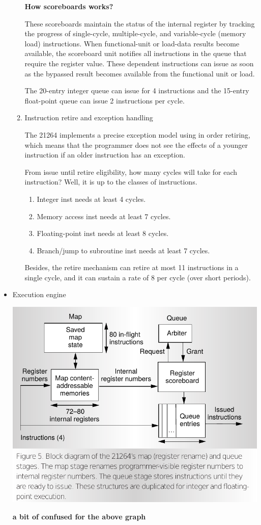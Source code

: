 \documentclass[11pt]{article}
\begin{document}
\begin{itemize}
\begin{enumerate}
		\textbf{How scoreboards works?}
		
		These scoreboards maintain the status of the internal register by tracking the progress of single-cycle, multiple-cycle, and variable-cycle (memory load) instructions. When functional-unit or load-data results become available, the scoreboard unit notifies all instructions in the queue that require the register value. These dependent instructions can issue as soon as the bypassed result becomes available from the functional unit or load.
		
		The 20-entry integer queue can issue for 4 instructions and the 15-entry float-point queue can issue 2 instructions per cycle.
		\item Instruction retire and exception handling
		
		The 21264 implements a precise exception model using in order retiring, which means that the programmer does not see the effects of a younger instruction if an older instruction has an exception.
		
		From issue until retire eligibility, how many cycles will take for each instruction? Well, it is up to the classes of instructions. \begin{enumerate}
			\item Integer inst needs at least 4 cycles.
			\item Memory access inst needs at least 7 cycles.
			\item Floating-point inst needs at least 8 cycles.
			\item Branch/jump to subroutine inst needs at least 7 cycles.
		\end{enumerate}
	
		Besides, the retire mechanism can retire at most 11 instructions in a single cycle, and it can sustain a rate of 8 per cycle (over short periods).
	\end{enumerate}
	\item Execution engine
	\begin{center}
		\includegraphics[scale=0.35]{rename.png}
	\end{center}
	\textbf{a bit of confused for the above graph}
	

\end{itemize}
\end{document}
